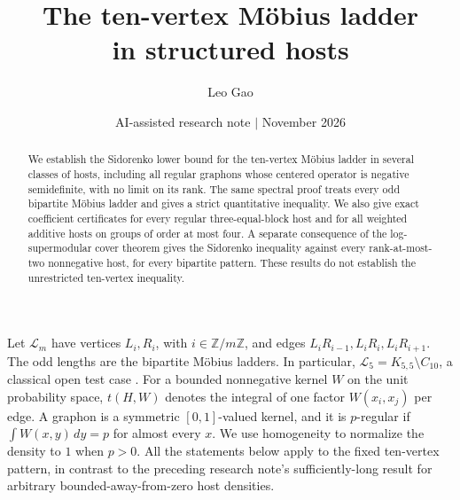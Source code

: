 \documentclass[11pt]{article}
\title{\textbf{The ten-vertex M\"obius ladder\\ in structured hosts}}
\author{Leo Gao}
\date{AI-assisted research note \enspace$\vert$\enspace 26 November 2026}
\newcommand{\La}{\mathcal L}
\begin{document}
\maketitle
\begin{abstract}
We establish the Sidorenko lower bound for the ten-vertex M\"obius ladder in several classes of hosts, including all regular graphons whose centered operator is negative semidefinite, with no limit on its rank. The same spectral proof treats every odd bipartite M\"obius ladder and gives a strict quantitative inequality. We also give exact coefficient certificates for every regular three-equal-block host and for all weighted additive hosts on groups of order at most four. A separate consequence of the log-supermodular cover theorem gives the Sidorenko inequality against every rank-at-most-two nonnegative host, for every bipartite pattern. These results do not establish the unrestricted ten-vertex inequality.
\end{abstract}

Let $\La_m$ have vertices $L_i,R_i$, with $i\in\mathbb Z/m\mathbb Z$, and edges $L_iR_{i-1},L_iR_i,L_iR_{i+1}$. The odd lengths are the bipartite M\"obius ladders. In particular, $\La_5=K_{5,5}\setminus C_{10}$, a classical open test case \cite{rossman,green}. For a bounded nonnegative kernel $W$ on the unit probability space, $t(H,W)$ denotes the integral of one factor $W(x_i,x_j)$ per edge. A graphon is a symmetric $[0,1]$-valued kernel, and it is $p$-regular if $\int W(x,y)\,dy=p$ for almost every $x$. We use homogeneity to normalize the density to $1$ when $p>0$. All the statements below apply to the fixed ten-vertex pattern, in contrast to the preceding research note's sufficiently-long result for arbitrary bounded-away-from-zero host densities.
\end{document}
